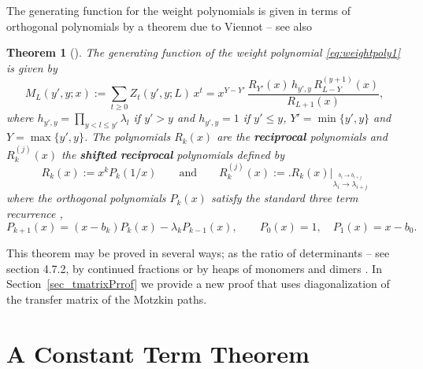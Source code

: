 \documentclass[11pt,a4paper]{article}
\newtheorem{theorem}{Theorem}
\newcommand{\la}{\lambda}
\newcommand{\recip}[1]{R}		%
\newcommand{\df}{:=}
\begin{document}
The generating function for the weight polynomials is given in terms of orthogonal polynomials by a theorem due to Viennot\cite{Viennot1985ah,viennot:1984fr}  -- see also \cite{Flajolet1980rr,goulden:1986kx}
\begin{theorem}[\cite{Viennot1985ah}]\label{thm:viennot}
	The generating function of the weight polynomial \eqref{eq:weightpoly1}  is given by
	\begin{equation}\label{eq:vienratio}
		M_L(y', y;x) \df \sum_{t\ge0} Z_t(y', y;L)\,x^t =x^{Y-Y'}\,\frac{\recip{P}_{Y'}(x)\,h_{y',y}\, \recip{P}^{(y+1)}_{L-Y}(x)}{\recip{P}_{L+1}(x)}, 
	\end{equation}
 where $h_{y',y}=  \prod_{y < l \le y'} \la_l$ if $y'> y$ and $h_{y',y}=1$ if $y'\le y$, $Y' =  \min \{ y', y\}$ and $ Y =  \max\{ y', y\}$. The polynomials  
  $\recip{P}_k(x)$  are the \textbf{reciprocal} polynomials and    $\recip{P}^{(j)}_k(x)$ the \textbf{shifted reciprocal}  polynomials  defined by
	\begin{equation}\label{eq:recippolys}
		\recip{P}_k(x)\df x^k P_k(1/x)\qquad\text{and}\qquad 
		\recip{P}^{(j)}_k(x)\df \biggl.\recip{P}_k(x)\biggr|_{\stackrel{b_i\to b_{i+j}}{\la_i\to \la_{i+j}}} 
	\end{equation}
	where the orthogonal polynomials $P_k(x)$ satisfy the standard three term recurrence \cite{chihara:1978lr,szego:1975ep},
	\begin{equation}\label{eq:threeTerm1}
		P_{k+1}(x)=(x-b_k)P_{k}(x)-\la_k P_{k-1}(x),\qquad P_0(x)=1,\quad P_1(x)=x-b_0.
	\end{equation}
\end{theorem}
This theorem may be proved in several ways; as the ratio of determinants -- see  \cite{stanley:1997vw} section 4.7.2,  by continued fractions \cite{Flajolet1980rr, goulden:1986kx} or by heaps of monomers and dimers \cite{viennot:1986fk}. In Section~\ref{sec_tmatrixPrrof} we provide a new proof that uses   diagonalization of the transfer matrix of the Motzkin paths.   



\section{A Constant Term Theorem} %
\label{sec_main_results}
\end{document}
